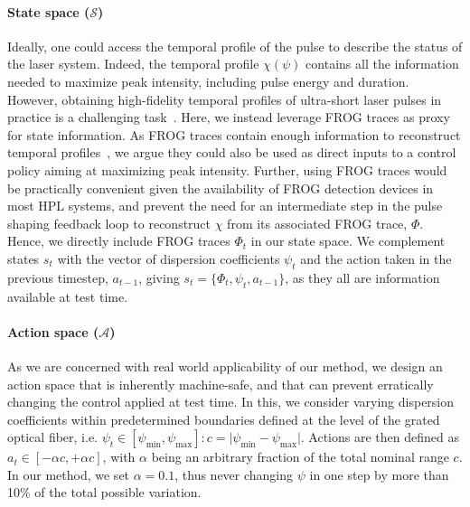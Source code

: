 \paragraph{State space (\( \mathcal S \))}
Ideally, one could access the temporal profile of the pulse to describe the status of the laser system. Indeed, the temporal profile \( \chi(\psi) \) contains all the information needed to maximize peak intensity, including pulse energy and duration.
However, obtaining high-fidelity temporal profiles of ultra-short laser pulses in practice is a challenging task~\citep{trebino1993using, trebino1997measuring}.
Here, we instead leverage FROG traces as proxy for state information.
As FROG traces contain enough information to reconstruct temporal profiles~\citep{zahavy2018deep}, we argue they could also be used as direct inputs to a control policy aiming at maximizing peak intensity. Further, using FROG traces would be practically convenient given the availability of FROG detection devices in most HPL systems, and prevent the need for an intermediate step in the pulse shaping feedback loop to reconstruct \( \chi \) from its associated FROG trace, \( \Phi \). Hence, we directly include FROG traces \( \Phi_t \) in our state space. We complement states \( s_t \) with the vector of dispersion coefficients \( \psi_t \) and the action taken in the previous timestep, \( a_{t-1} \), giving \( s_t = \{ \Phi_t, \psi_t, a_{t-1} \} \), as they all are information available at test time.

\paragraph{Action space (\( \mathcal A \))}
As we are concerned with real world applicability of our method, we design an action space that is inherently machine-safe, and that can prevent erratically changing the control applied at test time. In this, we consider varying dispersion coefficients within predetermined boundaries defined at the level of the grated optical fiber, i.e. \( \psi_t \in [\psi_{\text{min}}, \psi_\text{max}]: c = \vert\psi_{\text{min}} - \psi_\text{max} \vert \). Actions are then defined as \( a_t \in [-\alpha c, +\alpha c] \), with \( \alpha \) being an arbitrary fraction of the total nominal range \( c \). In our method, we set \( \alpha=0.1 \), thus never changing \( \psi \) in one step by more than 10\% of the total possible variation.

